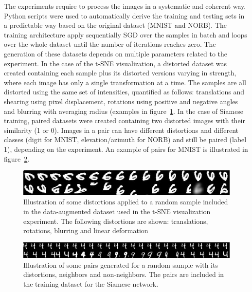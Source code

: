 \documentclass[a4paper,12pt]{report}
\begin{document}
The experiments require to process the images in a systematic and coherent way.
Python scripts were used to automatically derive the training and testing sets in a predictable way based on the original dataset (MNIST and NORB).
The training architecture apply sequentially SGD over the samples in batch and loops over the whole dataset until the number of iterations reaches zero.
The generation of these datasets depends on multiple parameters related to the experiment.
In the case of the t-SNE visualization, a distorted dataset was created containing each sample plus its distorted versions varying in strength, where each image has only a single transformation at a time.
The samples are all distorted using the same set of intensities, quantified as follows: translations and shearing using pixel displacement, rotations using positive and negative angles and blurring with averaging radius (examples in figure~\ref{fig:mnist_transfo_tsne}.
In the case of Siamese training, paired datasets were created containing two distorted images with their similarity (1 or 0).
Images in a pair can have different distortions and different classes (digit for MNIST, elevation/azimuth for NORB) and still be paired (label 1), depending on the experiment.
An example of pairs for MNIST is illustrated in figure~\ref{fig:mnist_pairs}.

\begin{figure}[t]
    \begin{center}
        \includegraphics{thesis_figures/mnist_transfo_tsne.jpg}
    \end{center}
    \caption{Illustration of some distortions applied to a random sample included in the data-augmented dataset used in the t-SNE visualization experiment. The following distortions are shown: translations, rotations, blurring and linear deformation}
    \label{fig:mnist_transfo_tsne}
\end{figure}

\begin{figure}[t]
    \begin{center}
        \includegraphics{thesis_figures/mnist_pairs.jpg}
    \end{center}
    \caption{Illustration of some pairs generated for a random sample with its distortions, neighbors and non-neighbors. The pairs are included in the training dataset for the Siamese network.}
    \label{fig:mnist_pairs}
\end{figure}
\end{document}
